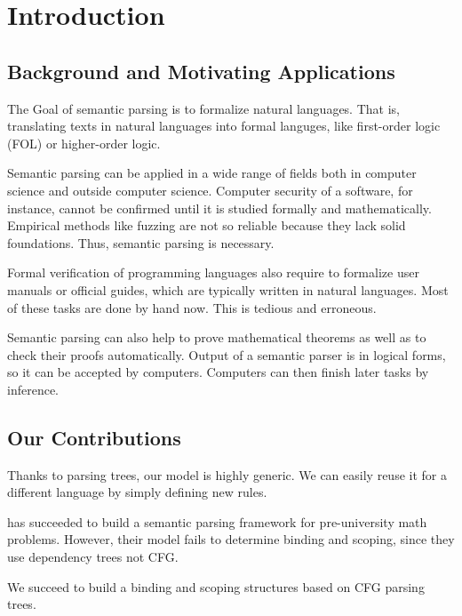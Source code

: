 \documentclass{article}
\begin{document}
\section{Introduction}{
	\subsection{Background and Motivating Applications}{
		The Goal of semantic parsing is to formalize natural languages. That is, translating texts in natural languages into formal languges, like first-order logic (FOL) or higher-order logic. 





		Semantic parsing can be applied in a wide range of fields both in computer science and outside computer science. Computer security of a software, for instance, cannot be confirmed until it is studied formally and mathematically. Empirical methods like fuzzing are not so reliable because they lack solid foundations. Thus, semantic parsing is necessary. 

		Formal verification of programming languages also require to formalize user manuals or official guides, which are typically written in natural languages. Most of these tasks are done by hand now. This is tedious and erroneous. 

		Semantic parsing can also help to prove mathematical theorems as well as to check their proofs automatically. Output of a semantic parser is in logical forms, so it can be accepted by computers. Computers can then finish later tasks by inference. 
	}

	\subsection{Our Contributions}{
		Thanks to parsing trees, our model is highly generic. We can easily reuse it for a different language by simply defining new rules. 

		\cite{matsuzaki} has succeeded to build a semantic parsing framework for pre-university math problems. However, their model fails to determine binding and scoping, since they use dependency trees not CFG. 

		We succeed to build a binding and scoping structures based on CFG parsing trees. 
	}
}
\end{document}
